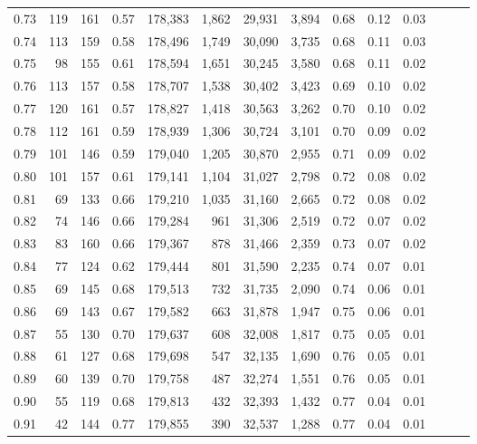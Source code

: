 \begin{tabular}{rrrrrrrrrrrrrr}
0.73 &     119 &  161 &  0.57 &  178,383 &    1,862 &  29,931 &   3,894 &  0.68 &  0.12 &      0.03 \\
0.74 &     113 &  159 &  0.58 &  178,496 &    1,749 &  30,090 &   3,735 &  0.68 &  0.11 &      0.03 \\
0.75 &      98 &  155 &  0.61 &  178,594 &    1,651 &  30,245 &   3,580 &  0.68 &  0.11 &      0.02 \\
0.76 &     113 &  157 &  0.58 &  178,707 &    1,538 &  30,402 &   3,423 &  0.69 &  0.10 &      0.02 \\
0.77 &     120 &  161 &  0.57 &  178,827 &    1,418 &  30,563 &   3,262 &  0.70 &  0.10 &      0.02 \\
0.78 &     112 &  161 &  0.59 &  178,939 &    1,306 &  30,724 &   3,101 &  0.70 &  0.09 &      0.02 \\
0.79 &     101 &  146 &  0.59 &  179,040 &    1,205 &  30,870 &   2,955 &  0.71 &  0.09 &      0.02 \\
0.80 &     101 &  157 &  0.61 &  179,141 &    1,104 &  31,027 &   2,798 &  0.72 &  0.08 &      0.02 \\
0.81 &      69 &  133 &  0.66 &  179,210 &    1,035 &  31,160 &   2,665 &  0.72 &  0.08 &      0.02 \\
0.82 &      74 &  146 &  0.66 &  179,284 &      961 &  31,306 &   2,519 &  0.72 &  0.07 &      0.02 \\
0.83 &      83 &  160 &  0.66 &  179,367 &      878 &  31,466 &   2,359 &  0.73 &  0.07 &      0.02 \\
0.84 &      77 &  124 &  0.62 &  179,444 &      801 &  31,590 &   2,235 &  0.74 &  0.07 &      0.01 \\
0.85 &      69 &  145 &  0.68 &  179,513 &      732 &  31,735 &   2,090 &  0.74 &  0.06 &      0.01 \\
0.86 &      69 &  143 &  0.67 &  179,582 &      663 &  31,878 &   1,947 &  0.75 &  0.06 &      0.01 \\
0.87 &      55 &  130 &  0.70 &  179,637 &      608 &  32,008 &   1,817 &  0.75 &  0.05 &      0.01 \\
0.88 &      61 &  127 &  0.68 &  179,698 &      547 &  32,135 &   1,690 &  0.76 &  0.05 &      0.01 \\
0.89 &      60 &  139 &  0.70 &  179,758 &      487 &  32,274 &   1,551 &  0.76 &  0.05 &      0.01 \\
0.90 &      55 &  119 &  0.68 &  179,813 &      432 &  32,393 &   1,432 &  0.77 &  0.04 &      0.01 \\
0.91 &      42 &  144 &  0.77 &  179,855 &      390 &  32,537 &   1,288 &  0.77 &  0.04 &      0.01 \\

\end{tabular}
